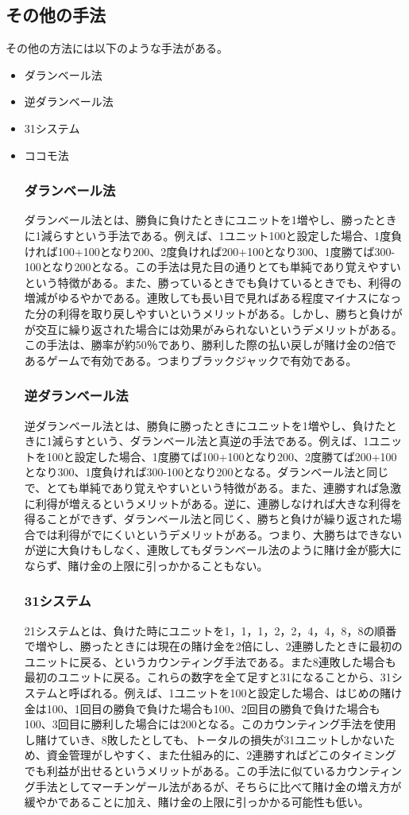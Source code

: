 \subsection{その他の手法}
その他の方法には以下のような手法がある。
\begin{itemize}
\item ダランベール法
\item 逆ダランベール法
\item 31システム
\item ココモ法
\subsubsection{ダランベール法}
ダランベール法とは、勝負に負けたときにユニットを1増やし、勝ったときに1減らすという手法である。例えば、1ユニット100と設定した場合、1度負ければ100+100となり200、2度負ければ200+100となり300、1度勝てば300-100となり200となる。この手法は見た目の通りとても単純であり覚えやすいという特徴がある。また、勝っているときでも負けているときでも、利得の増減がゆるやかである。連敗しても長い目で見ればある程度マイナスになった分の利得を取り戻しやすいというメリットがある。しかし、勝ちと負けがが交互に繰り返された場合には効果がみられないというデメリットがある。この手法は、勝率が約50％であり、勝利した際の払い戻しが賭け金の2倍であるゲームで有効である。つまりブラックジャックで有効である。
\subsubsection{逆ダランベール法}
逆ダランベール法とは、勝負に勝ったときにユニットを1増やし、負けたときに1減らすという、ダランベール法と真逆の手法である。例えば、1ユニットを100と設定した場合、1度勝てば100+100となり200、2度勝てば200+100となり300、1度負ければ300-100となり200となる。ダランベール法と同じで、とても単純であり覚えやすいという特徴がある。また、連勝すれば急激に利得が増えるというメリットがある。逆に、連勝しなければ大きな利得を得ることができず、ダランベール法と同じく、勝ちと負けが繰り返された場合では利得がでにくいというデメリットがある。つまり、大勝ちはできないが逆に大負けもしなく、連敗してもダランベール法のように賭け金が膨大にならず、賭け金の上限に引っかかることもない。
\subsubsection{31システム}
21システムとは、負けた時にユニットを1，1，1，2，2，4，4，8，8の順番で増やし、勝ったときには現在の賭け金を2倍にし、2連勝したときに最初のユニットに戻る、というカウンティング手法である。また8連敗した場合も最初のユニットに戻る。これらの数字を全て足すと31になることから、31システムと呼ばれる。例えば、1ユニットを100と設定した場合、はじめの賭け金は100、1回目の勝負で負けた場合も100、2回目の勝負で負けた場合も100、3回目に勝利した場合には200となる。このカウンティング手法を使用し賭けていき、8敗したとしても、トータルの損失が31ユニットしかないため、資金管理がしやすく、また仕組み的に、2連勝すればどこのタイミングでも利益が出せるというメリットがある。この手法に似ているカウンティング手法としてマーチンゲール法があるが、そちらに比べて賭け金の増え方が緩やかであることに加え、賭け金の上限に引っかかる可能性も低い。

\end{itemize}
